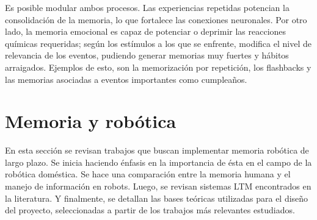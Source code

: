 Es posible modular ambos procesos. Las experiencias repetidas potencian la consolidación de la memoria, lo que fortalece las conexiones neuronales. Por otro lado, la memoria emocional es capaz de potenciar o deprimir las reacciones químicas requeridas; según los estímulos a los que se enfrente, modifica el nivel de relevancia de los eventos, pudiendo generar memorias muy fuertes y hábitos arraigados. Ejemplos de esto, son la memorización por repetición, los flashbacks y las memorias asociadas a eventos importantes como cumpleaños.









\section{Memoria y robótica}\label{sec:robotic_memory}

En esta sección se revisan trabajos que buscan implementar memoria robótica de largo plazo. Se inicia haciendo énfasis en la importancia de ésta en el campo de la robótica doméstica. Se hace una comparación entre la memoria humana y el manejo de información en robots. Luego, se revisan sistemas LTM encontrados en la literatura. Y finalmente, se detallan las bases teóricas utilizadas para el diseño del proyecto, seleccionadas a partir de los trabajos más relevantes estudiados.


